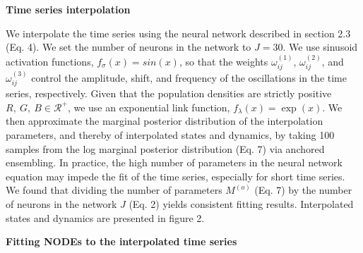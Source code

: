 \documentclass[11pt, oneside]{article}
\begin{document}
\textbf{Time series interpolation}

We interpolate the time series using the neural network described in section 2.3 (Eq. 4).
We set the number of neurons in the network to $J=30$.
We use sinusoid activation functions, $f_\sigma(x) = sin(x)$, so that the weights $\omega^{(1)}_{ij}$, $\omega^{(2)}_{ij}$, and $\omega^{(3)}_{ij}$ control the amplitude, shift, and frequency of the oscillations in the time series, respectively.
Given that the population densities are strictly positive $R,~G,~B \in \mathcal{R^{+}}$, we use an exponential link function, $f_\lambda(x) = \exp (x)$. 
We then approximate the marginal posterior distribution of the interpolation parameters, and thereby of interpolated states and dynamics, by taking 100 samples from the log marginal posterior distribution (Eq. 7) via anchored ensembling. %
In practice, the high number of parameters in the neural network equation may impede the fit of the time series, especially for short time series. 
We found that dividing the number of parameters $M^{(o)}$ (Eq. 7) by the number of neurons in the network $J$ (Eq. 2) yields consistent fitting results.
Interpolated states and dynamics are presented in figure 2.

\textbf{Fitting NODEs to the interpolated time series}
\end{document}
